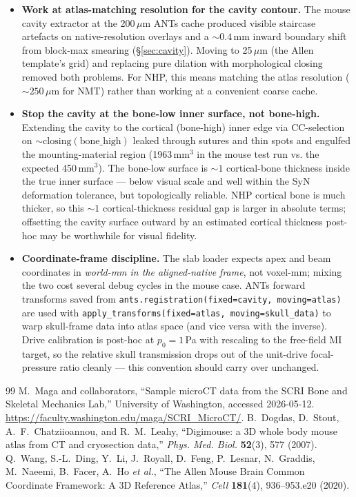 \documentclass{compactarticle}
\begin{document}
\begin{itemize}[leftmargin=*]
\item \textbf{Work at atlas-matching resolution for the cavity
      contour.} The mouse cavity extractor at the 200\,$\mu$m ANTs
      cache produced visible staircase artefacts on native-resolution
      overlays and a ${\sim}0.4$\,mm inward boundary shift from
      block-max smearing (\S\ref{sec:cavity}). Moving to 25\,$\mu$m
      (the Allen template's grid) and replacing pure dilation with
      morphological closing removed both problems. For NHP, this
      means matching the atlas resolution ($\sim 250$\,$\mu$m for
      NMT) rather than working at a convenient coarse cache.
\item \textbf{Stop the cavity at the bone-low inner surface, not
      bone-high.} Extending the cavity to the cortical (bone-high)
      inner edge via CC-selection on
      $\sim\!\!\mathrm{closing}(\mathrm{bone\_high})$ leaked through
      sutures and thin spots and engulfed the mounting-material
      region (1963\,mm$^3$ in the mouse test run vs. the expected
      450\,mm$^3$). The bone-low surface is ${\sim}1$ cortical-bone
      thickness inside the true inner surface --- below visual scale
      and well within the SyN deformation tolerance, but topologically
      reliable. NHP cortical bone is much thicker, so this ${\sim}1$
      cortical-thickness residual gap is larger in absolute terms;
      offsetting the cavity surface outward by an estimated cortical
      thickness post-hoc may be worthwhile for visual fidelity.
\item \textbf{Coordinate-frame discipline.} The slab loader expects
      apex and beam coordinates in \emph{world-mm in the
      aligned-native frame}, not voxel-mm; mixing the two cost
      several debug cycles in the mouse case. ANTs forward transforms
      saved from \texttt{ants.registration(fixed=cavity,
      moving=atlas)} are used with
      \texttt{apply\_transforms(fixed=atlas, moving=skull\_data)} to
      warp skull-frame data into atlas space (and vice versa with the
      inverse). Drive calibration is post-hoc at $p_0 = 1$\,Pa with
      rescaling to the free-field MI target, so the relative skull
      transmission drops out of the unit-drive focal-pressure ratio
      cleanly --- this convention should carry over unchanged.
\end{itemize}

\begin{thebibliography}{99}
 M.~Maga and collaborators, ``Sample microCT
  data from the SCRI Bone and Skeletal Mechanics Lab,'' University of
  Washington, accessed 2026-05-12.
  \url{https://faculty.washington.edu/maga/SCRI_MicroCT/}.
 B.~Dogdas, D.~Stout, A.~F.~Chatziioannou, and
  R.~M.~Leahy, ``Digimouse: a 3D whole body mouse atlas from CT and
  cryosection data,'' \emph{Phys. Med. Biol.} {\bf 52}(3), 577 (2007).
 Q.~Wang, S.-L.~Ding, Y.~Li, J.~Royall, D.~Feng,
  P.~Lesnar, N.~Graddis, M.~Naeemi, B.~Facer, A.~Ho \emph{et al.},
  ``The Allen Mouse Brain Common Coordinate Framework: A 3D Reference
  Atlas,'' \emph{Cell} {\bf 181}(4), 936--953.e20 (2020).
\end{thebibliography}
\end{document}
